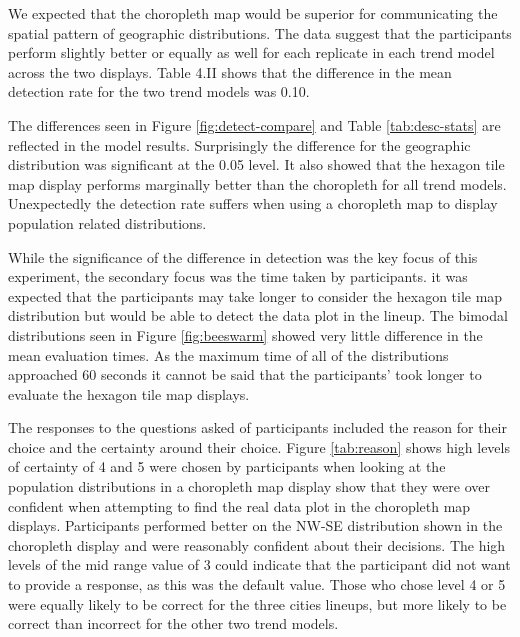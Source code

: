 \documentclass{monashthesis}
\begin{document}
We expected that the choropleth map would be superior for communicating the spatial pattern of geographic distributions. The data suggest that the participants perform slightly better or equally as well for each replicate in each trend model across the two displays. Table 4.II shows that the difference in the mean detection rate for the two trend models was 0.10.

The differences seen in Figure \ref{fig:detect-compare} and Table \ref{tab:desc-stats} are reflected in the model results. Surprisingly the difference for the geographic distribution was significant at the 0.05 level.
It also showed that the hexagon tile map display performs marginally better than the choropleth for all trend models. Unexpectedly the detection rate suffers when using a choropleth map to display population related distributions.

While the significance of the difference in detection was the key focus of this experiment, the secondary focus was the time taken by participants. it was expected that the participants may take longer to consider the hexagon tile map distribution but would be able to detect the data plot in the lineup.
The bimodal distributions seen in Figure \ref{fig:beeswarm} showed very little difference in the mean evaluation times. As the maximum time of all of the distributions approached 60 seconds it cannot be said that the participants' took longer to evaluate the hexagon tile map displays.

The responses to the questions asked of participants included the reason for their choice and the certainty around their choice.
Figure \ref{tab:reason} shows high levels of certainty of 4 and 5 were chosen by participants when looking at the population distributions in a choropleth map display show that they were over confident when attempting to find the real data plot in the choropleth map displays. Participants performed better on the NW-SE distribution shown in the choropleth display and were reasonably confident about their decisions.
The high levels of the mid range value of 3 could indicate that the participant did not want to provide a response, as this was the default value. Those who chose level 4 or 5 were equally likely to be correct for the three cities lineups, but more likely to be correct than incorrect for the other two trend models.
\end{document}
